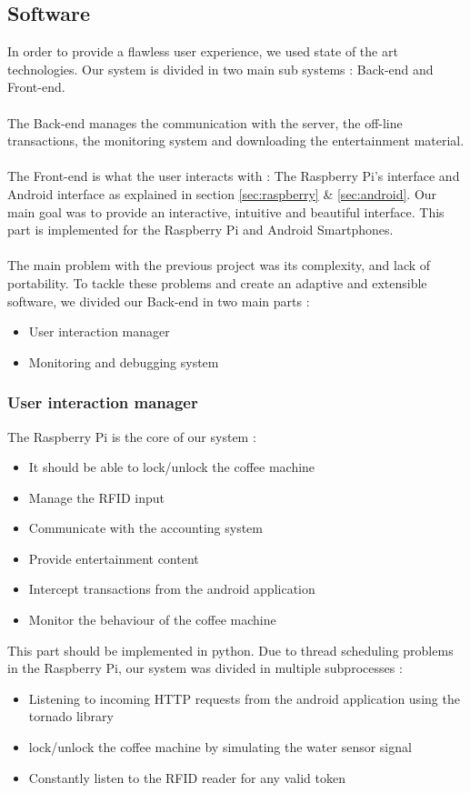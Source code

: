 \documentclass[12pt]{article}
\begin{document}
  \subsection{Software}
  
  In order to provide a flawless user experience, we used state of the art technologies. Our system is divided in two main sub systems : Back-end and Front-end.\\~\\
  The Back-end manages the communication with the server, the off-line transactions, the monitoring system and downloading the entertainment material. \\~\\
  The Front-end is what the user interacts with : The Raspberry Pi's interface and Android interface as explained in section \ref{sec:raspberry} \& \ref{sec:android}. 
  Our main goal was to provide an interactive, intuitive and beautiful interface. 
  This part is implemented for the Raspberry Pi and Android Smartphones.\\~\\
  The main problem with the previous project was its complexity, and lack of portability.
  To tackle these problems and create an adaptive and extensible software, we divided our Back-end in two main parts :

   \begin{itemize}
    \item User interaction manager
    \item Monitoring and debugging system
   \end{itemize}
   
  \subsubsection{User interaction manager}
  
  The Raspberry Pi is the core of our system :
  \begin{itemize}
    \item It should be able to lock/unlock the coffee machine
    \item Manage the RFID input
    \item Communicate with the accounting system
    \item Provide entertainment content
    \item Intercept transactions from the android application
    \item Monitor the behaviour of the coffee machine
   \end{itemize}
   This part should be implemented in python. Due to thread scheduling problems in the Raspberry Pi,
   our system was divided in multiple subprocesses :
   \begin{itemize}
    \item Listening to incoming HTTP requests from the android application using the tornado library
    \item lock/unlock the coffee machine by simulating the water sensor signal
    \item Constantly listen to the RFID reader for any valid token
   \end{itemize}
   
\end{document}
